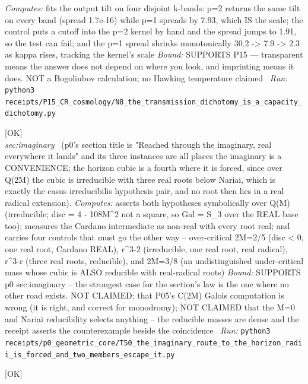 \begin{description}
\emph{Computes:} fits the output tilt on four disjoint k-bands: p=2 returns the same tilt on every band (spread 1.7e-16) while p=1 spreads by 7.93, which IS the scale; the control puts a cutoff into the p=2 kernel by hand and the spread jumps to 1.91, so the test can fail; and the p=1 spread shrinks monotonically 30.2 -> 7.9 -> 2.3 as kappa rises, tracking the kernel's scale
 \emph{Bound:} SUPPORTS P15 --- transparent means the answer does not depend on where you look, and imprinting means it does. NOT a Bogoliubov calculation; no Hawking temperature claimed
\ \emph{Run:} \texttt{python3 receipts/P15\_CR\_cosmology/N8\_the\_transmission\_dichotomy\_is\_a\_capacity\_dichotomy.py}
\item[\label{rcpt:T50_the_imaginary_route_to_the_horizon_radii_is_forced_and_two_members_escape_it}\texttt{T50\_the\_imaginary\_route\_to\_the\_horizon\_radii\_is\_forced\_and\_two\_members\_escape\_it}]\hfill\textsf{[OK]}\\
\textit{sec:imaginary} \ (p0's section title is "Reached through the imaginary, real everywhere it lands" and its three instances are all places the imaginary is a CONVENIENCE; the horizon cubic is a fourth where it is forced, since over Q(2M) the cubic is irreducible with three real roots below Nariai, which is exactly the casus irreducibilis hypothesis pair, and no root then lies in a real radical extension). 
\emph{Computes:} asserts both hypotheses symbolically over Q(M) (irreducible; disc = 4 - 108M\textasciicircum{}2 not a square, so Gal = S\_3 over the REAL base too); measures the Cardano intermediate as non-real with every root real; and carries four controls that must go the other way -- over-critical 2M=2/5 (disc < 0, one real root, Cardano REAL), r\textasciicircum{}3-2 (irreducible, one real root, real radical), r\textasciicircum{}3-r (three real roots, reducible), and 2M=3/8 (an undistinguished under-critical mass whose cubic is ALSO reducible with real-radical roots)
 \emph{Bound:} SUPPORTS p0 sec:imaginary -- the strongest case for the section's law is the one where no other road exists. NOT CLAIMED: that P05's C(2M) Galois computation is wrong (it is right, and correct for monodromy); NOT CLAIMED that the M=0 and Nariai reducibility selects anything -- the reducible masses are dense and the receipt asserts the counterexample beside the coincidence
\ \emph{Run:} \texttt{python3 receipts/p0\_geometric\_core/T50\_the\_imaginary\_route\_to\_the\_horizon\_radii\_is\_forced\_and\_two\_members\_escape\_it.py}
\item[\label{rcpt:G1_the_six_hinge_ends_carry_an_octahedron_and_the_hinges_are_its_antipodes}\texttt{G1\_the\_six\_hinge\_ends\_carry\_an\_octahedron\_and\_the\_hinges\_are\_its\_antipodes}]\hfill\textsf{[OK]}\\

\end{description}
